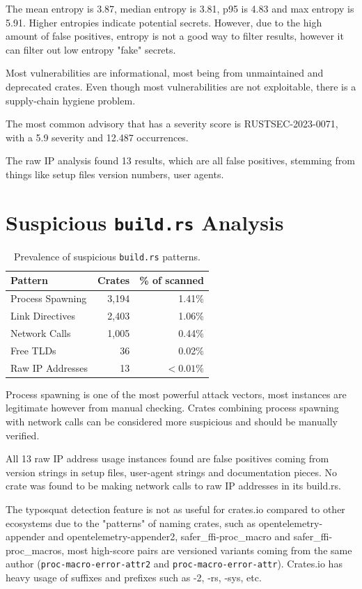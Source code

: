The mean entropy is 3.87, median entropy is 3.81, p95 is 4.83 and max entropy is 5.91. Higher entropies indicate potential secrets. However, due to the high amount of false positives, entropy is not a good way to filter results, however it can filter out low entropy "fake" secrets.

Most vulnerabilities are informational, most being from unmaintained and deprecated crates. Even though most vulnerabilities are not exploitable, there is a supply-chain hygiene problem.

The most common advisory that has a severity score is RUSTSEC-2023-0071, with a 5.9 severity and 12.487 occurrences.


The raw IP analysis found 13 results, which are all false positives, stemming from things like setup files version numbers, user agents.
\section{Suspicious \texttt{build.rs} Analysis}\label{sect:build-rs-results}

\begin{table}[ht]
\centering
\caption{Prevalence of suspicious \texttt{build.rs} patterns.}\label{tab:suspicious-buildrs}
\begin{tabular}{|l|r|r|}
\hline
\textbf{Pattern} & \textbf{Crates} & \textbf{\% of scanned} \\
\hline
Process Spawning & 3,194 & 1.41\% \\
Link Directives  & 2,403 & 1.06\% \\
Network Calls    & 1,005 & 0.44\% \\
Free TLDs        &    36 & 0.02\% \\
Raw IP Addresses &    13 & $<0.01\%$ \\
\hline
\end{tabular}
\end{table}

Process spawning is one of the most powerful attack vectors, most instances are legitimate however from manual checking. Crates combining process spawning with network calls can be considered more suspicious and should be manually verified.

All 13 raw IP address usage instances found are false positives coming from version strings in setup files, user-agent strings and documentation pieces. No crate was found to be making network calls to raw IP addresses in its build.rs.

The typosquat detection feature is not as useful for crates.io compared to other ecosystems due to the "patterns" of naming crates, such as opentelemetry-appender and opentelemetry-appender2, safer\_ffi-proc\_macro and safer\_ffi-proc\_macros, most high-score pairs are versioned variants coming from the same author (\texttt{proc-macro-error-attr2} and \texttt{proc-macro-error-attr}). Crates.io has heavy usage of suffixes and prefixes such as -2, -rs, -sys, etc.

